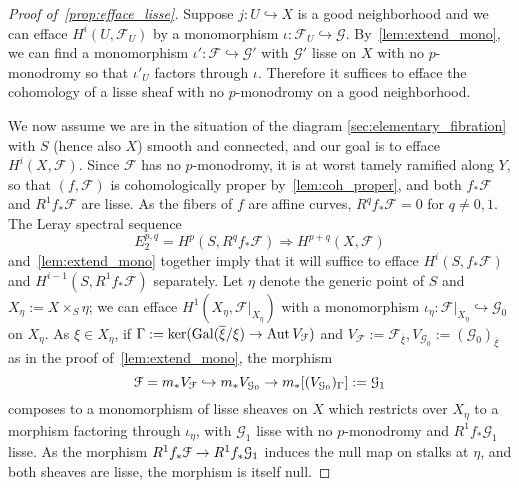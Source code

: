\documentclass[deligne.tex]{subfiles}
\begin{document}
\begin{proof}[Proof of~\eqref{prop:efface_lisse}]
Suppose $j:U\hookrightarrow X$ is a good neighborhood and we can efface
$H^i(U,\mathcal F_U)$ by a monomorphism
$\iota:\mathcal F_U\hookrightarrow\mathcal G$.
By~\eqref{lem:extend_mono}, we can find a monomorphism
$\iota':\mathcal F\hookrightarrow\mathcal G'$ with $\mathcal G'$ 
lisse on $X$ with no $p$-monodromy so that $\iota'_U$ factors 
through $\iota$.
Therefore it suffices to efface the cohomology of a lisse sheaf with
no $p$-monodromy on a good neighborhood.

We now assume we are in the situation of the diagram 
\eqref{sec:elementary_fibration} with $S$ (hence also $X$) smooth and 
connected, and our goal is to efface $H^i(X,\mathcal F)$. Since $\mathcal F$
has no $p$-monodromy, it is at worst tamely ramified along $Y$, so that
$(f,\mathcal F)$ is cohomologically proper by~\eqref{lem:coh_proper}, and
both $f_*\mathcal F$ and $R^1f_*\mathcal F$ are lisse. As the fibers of $f$
are affine curves, $R^qf_*\mathcal F=0$ for $q\ne0,1$.
The Leray spectral sequence
\begin{equation*}
	E^{p,q}_2=H^p(S,R^qf_*\mathcal F)\Rightarrow H^{p+q}(X,\mathcal F)
\end{equation*}
and~\eqref{lem:extend_mono} together imply that it will suffice to efface 
$H^i(S,f_*\mathcal F)$ and $H^{i-1}(S,R^1f_*\mathcal F)$ separately.
Let $\eta$ denote the generic point of $S$ and $X_\eta:=X\times_S\eta$;
we can efface $H^1(X_\eta,\mathcal F|_{X_\eta})$ with a monomorphism
$\iota_\eta:\mathcal F|_{X_\eta}\hookrightarrow\mathcal G_0$ on $X_\eta$.
As $\xi\in X_\eta$, if
$\Gamma:=\ker(\operatorname{Gal}(\overline\xi/\xi)\rightarrow\operatorname{Aut} V_{\mathcal F})$
and $V_{\mathcal F}:=\mathcal F_{\overline\xi},V_{\mathcal G_0}:=(\mathcal G_0)_{\overline\xi}$
as in the proof of~\eqref{lem:extend_mono}, the morphism
\begin{equation*}
	\mathcal F=m_*V_{\mathcal F}\hookrightarrow
	m_*V_{\mathcal G_0}\rightarrow
	m_*[(V_{\mathcal G_0})_\Gamma]:=\mathcal G_1
\end{equation*}
composes to a monomorphism of lisse sheaves on $X$
which restricts over $X_\eta$ to a morphism factoring through $\iota_\eta$,
with $\mathcal G_1$ lisse with no $p$-monodromy and $R^1f_*\mathcal G_1$ 
lisse. As the morphism $R^1f_*\mathcal F\rightarrow R^1f_*\mathcal G_1$ induces the
null map on stalks at $\eta$, and both sheaves are lisse, the morphism is
itself null.


\end{proof}
\end{document}
